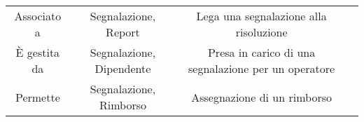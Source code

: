 \begin{center}
\begin{tabular}{ |c|c|c|c|}
\multirow{3}{6em}{Associato a} & \multirow{3}{12em}{Segnalazione, Report} & \multirow{3}{8em}{Lega una segnalazione alla risoluzione} & \multirow{3}{12em}{} \\
 &  &  & \\
 &  &  & \\
\hline

\multirow{3}{6em}{È gestita da} & \multirow{3}{12em}{Segnalazione, Dipendente} & \multirow{3}{8em}{Presa in carico di una segnalazione per un operatore} & \multirow{3}{12em}{} \\
&  &  & \\
&  &  & \\ 
\hline

\multirow{3}{6em}{Permette} & \multirow{3}{12em}{Segnalazione, Rimborso} & \multirow{3}{8em}{Assegnazione di un rimborso} & \multirow{3}{12em}{} \\
&  &  & \\
&  &  & \\ 
\hline
\end{tabular}
\end{center}